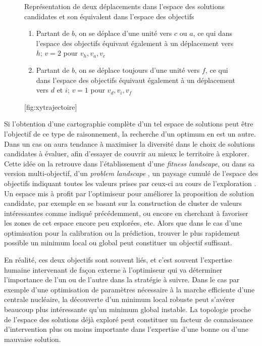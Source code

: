 \begin{figure}[!htbp]
	\begin{sidecaption}[fortoc]{Représentation de deux déplacements dans l'espace des solutions candidates et son équivalent dans l'espace des objectifs
	\parbox{\marginparwidth}{
	\begin{enumerate}[label=(\alph*),labelindent=\parindent,leftmargin=*]
	        \item Partant de $b$, on se déplace d'une unité vers $c$ ou $a$, ce qui dans l'espace des objectifs équivaut également à un déplacement vers $h$; $v=2$ pour $v_h, v_a, v_c$
	        \item Partant de $b$, on se déplace toujours d'une unité vers $f$, ce qui dans l'espace des objectifs équivaut également à un déplacement vers $d$ et $i$; $v=1$ pour $v_d,v_i,v_f$
	\end{enumerate}}}[fig:xytrajectoire]
	 \centering
	  \qquad
	\end{sidecaption}
\end{figure}

Si l'obtention d'une cartographie complète d'un tel espace de solutions peut être l'objectif de ce type de raisonnement, la recherche d'un optimum en est un autre. Dans un cas on aura tendance à maximiser la diversité dans le choix de solutions candidates à évaluer, afin d'essayer de couvrir au mieux le territoire à explorer. Cette idée on la retrouve dans l'établissement d'une \textit{fitness landscape}, ou dans sa version multi-objectif, d'un \textit{problem landscape} \autocite[93-94]{Weise2011}, un paysage cumulé de l'espace des objectifs indiquant toutes les valeurs prises par ceux-ci au cours de l'exploration . Un espace mis à profit par l'optimiseur pour améliorer la proposition de solution candidate, par exemple en se basant sur la construction de cluster de valeurs intéressantes comme indiqué précédemment, ou encore en cherchant à favoriser les zones de cet espace encore peu explorées, etc. Alors que dans le cas d'une optimisation pour la calibration ou la prédiction, trouver le plus rapidement possible un minimum local ou global peut constituer un objectif suffisant.

En réalité, ces deux objectifs sont souvent liés, et c'est souvent l'expertise humaine intervenant de façon externe à l'optimiseur qui va déterminer l'importance de l'un ou de l'autre dans la stratégie à suivre. Dans le cas par exemple d'une optimisation de paramètres nécessaire à la marche efficiente d'une centrale nucléaire, la découverte d'un minimum local robuste peut s'avérer beaucoup plus intéressante qu'un minimum global instable. La topologie proche de l'espace des solutions déjà exploré peut constituer un facteur de connaissance d'intervention plus ou moins importante dans l'expertise d'une bonne ou d'une mauvaise solution. 

